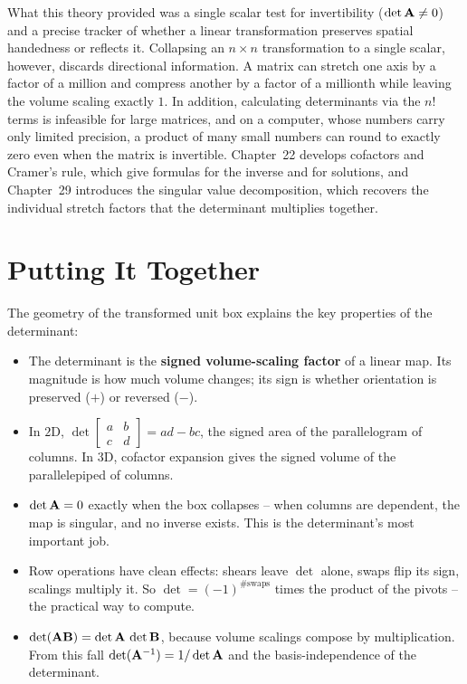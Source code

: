 \begin{historybox}
What this theory provided was a single scalar test for invertibility ($\det\mathbf{A} \neq 0$) and a precise tracker of whether a linear transformation preserves spatial handedness or reflects it. Collapsing an $n\times n$ transformation to a single scalar, however, discards directional information. A matrix can stretch one axis by a factor of a million and compress another by a factor of a millionth while leaving the volume scaling exactly $1$. In addition, calculating determinants via the $n!$ terms is infeasible for large matrices, and on a computer, whose numbers carry only limited precision, a product of many small numbers can round to exactly zero even when the matrix is invertible. Chapter~22 develops cofactors and Cramer's rule, which give formulas for the inverse and for solutions, and Chapter~29 introduces the singular value decomposition, which recovers the individual stretch factors that the determinant multiplies together.
\end{historybox}

\section{Putting It Together}
\label{ch21:together}

The geometry of the transformed unit box explains the key properties of the determinant:

\begin{itemize}
  \item The determinant is the \textbf{signed volume-scaling factor} of a linear
        map. Its magnitude is how much volume changes; its sign is whether
        orientation is preserved ($+$) or reversed ($-$).
  \item In $2$D, $\det\begin{bmatrix} a & b \\ c & d \end{bmatrix} = ad - bc$, the
        signed area of the parallelogram of columns. In $3$D, cofactor expansion
        gives the signed volume of the parallelepiped of columns.
  \item $\det\mathbf{A} = 0$ exactly when the box collapses -- when columns are
        dependent, the map is singular, and no inverse exists. This is the
        determinant's most important job.
  \item Row operations have clean effects: shears leave $\det$ alone, swaps flip
        its sign, scalings multiply it. So $\det = (-1)^{\#\text{swaps}}$ times the
        product of the pivots -- the practical way to compute.
  \item $\det(\mathbf{A}\mathbf{B}) = \det\mathbf{A}\,\det\mathbf{B}$, because volume scalings
        compose by multiplication. From this fall $\det(\mathbf{A}^{-1}) =
        1/\det\mathbf{A}$ and the basis-independence of the determinant.
\end{itemize}

